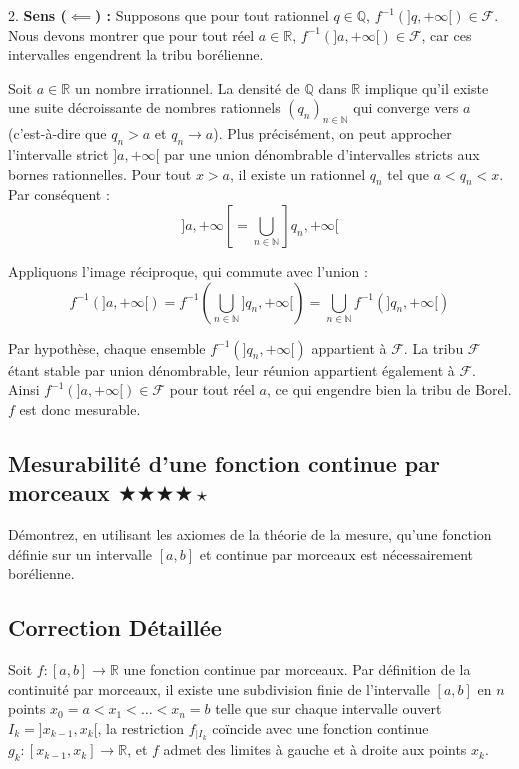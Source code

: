 \documentclass[11pt,a4paper]{article}
\begin{document}
2. \textbf{Sens ($\impliedby$) :}
   Supposons que pour tout rationnel $q \in \mathbb{Q}$, $f^{-1}(]q, +\infty[) \in \mathcal{F}$.
   Nous devons montrer que pour tout réel $a \in \mathbb{R}$, $f^{-1}(]a, +\infty[) \in \mathcal{F}$, car ces intervalles engendrent la tribu borélienne.

   Soit $a \in \mathbb{R}$ un nombre irrationnel.
   La densité de $\mathbb{Q}$ dans $\mathbb{R}$ implique qu'il existe une suite décroissante de nombres rationnels $(q_n)_{n \in \mathbb{N}}$ qui converge vers $a$ (c'est-à-dire que $q_n > a$ et $q_n \to a$).
   Plus précisément, on peut approcher l'intervalle strict $]a, +\infty[$ par une union dénombrable d'intervalles stricts aux bornes rationnelles.
   Pour tout $x > a$, il existe un rationnel $q_n$ tel que $a < q_n < x$. Par conséquent :
   $$ ]a, +\infty[ = \bigcup_{n \in \mathbb{N}} ]q_n, +\infty[ $$

   Appliquons l'image réciproque, qui commute avec l'union :
   $$ f^{-1}(]a, +\infty[) = f^{-1}\left(\bigcup_{n \in \mathbb{N}} ]q_n, +\infty[\right) = \bigcup_{n \in \mathbb{N}} f^{-1}(]q_n, +\infty[) $$

   Par hypothèse, chaque ensemble $f^{-1}(]q_n, +\infty[)$ appartient à $\mathcal{F}$.
   La tribu $\mathcal{F}$ étant stable par union dénombrable, leur réunion appartient également à $\mathcal{F}$.
   Ainsi $f^{-1}(]a, +\infty[) \in \mathcal{F}$ pour tout réel $a$, ce qui engendre bien la tribu de Borel.
   $f$ est donc mesurable.


\vspace{0.5cm}

\subsection*{Mesurabilité d'une fonction continue par morceaux \quad $\bigstar\bigstar\bigstar\bigstar\star$}

Démontrez, en utilisant les axiomes de la théorie de la mesure, qu'une fonction définie sur un intervalle $[a,b]$ et continue par morceaux est nécessairement borélienne.

\subsection*{Correction Détaillée}

Soit $f : [a,b] \to \mathbb{R}$ une fonction continue par morceaux.
Par définition de la continuité par morceaux, il existe une subdivision finie de l'intervalle $[a,b]$ en $n$ points $x_0 = a < x_1 < \dots < x_n = b$ telle que sur chaque intervalle ouvert $I_k = ]x_{k-1}, x_k[$, la restriction $f_{|I_k}$ coïncide avec une fonction continue $g_k : [x_{k-1}, x_k] \to \mathbb{R}$, et $f$ admet des limites à gauche et à droite aux points $x_k$.
\end{document}
